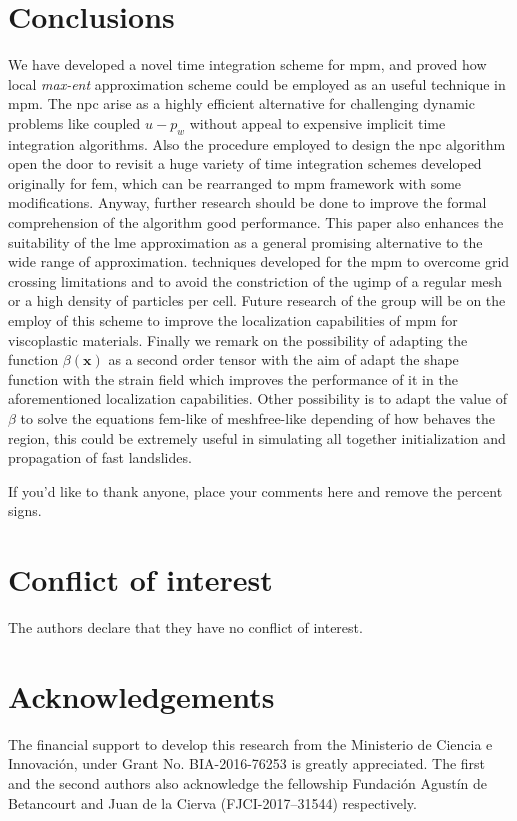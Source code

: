 \documentclass[preprint,12pt,a4paper]{elsarticle}
\newcommand{\vect}[1]{
  \ensuremath{\mathbf{{#1}}}
}
\begin{document}
\section{Conclusions}
\label{sec:conclusions}
We have developed a novel time integration scheme for \acrshort{mpm}, and
proved how local \textit{max-ent} approximation scheme could be
employed as an useful technique in \acrshort{mpm}. The \acrshort{npc} arise as a highly
efficient alternative for challenging dynamic problems like coupled
$u-p_w$ without appeal to expensive implicit time integration
algorithms. Also the procedure employed to design the \acrshort{npc} algorithm open
the door to revisit a huge variety of time integration schemes
developed originally for \acrshort{fem}, which can be rearranged to \acrshort{mpm} framework
with some modifications. Anyway, further research should be done to improve the
formal comprehension of the algorithm good performance. This paper
also enhances the suitability of the \acrshort{lme} approximation as a
general promising alternative to the wide range of approximation.
techniques developed for the \acrshort{mpm} to overcome grid crossing
limitations and to avoid the constriction of the \acrshort{ugimp} of a regular mesh
or a high density of particles per cell. Future research of the
group will be on the employ of this scheme to improve the localization
capabilities of \acrshort{mpm} for viscoplastic materials. Finally we remark on
the possibility of adapting the function $\beta(\vect{x})$ as a second
order tensor with the aim of adapt the shape function with the strain field which improves the
performance of it in the aforementioned localization
capabilities. Other possibility is to adapt the value of $\beta$ to
solve the equations \acrshort{fem}-like of meshfree-like depending of how behaves
the region, this could be extremely useful in simulating all together
initialization and propagation of fast landslides.

\begin{acknowledgements}
If you'd like to thank anyone, place your comments here
and remove the percent signs.
\end{acknowledgements}

% 
\section*{Conflict of interest}
%
The authors declare that they have no conflict of interest.

% 
\section*{Acknowledgements}
%
The financial support to develop this research from the Ministerio de Ciencia e Innovaci\'on, under Grant No. BIA-2016-76253 is greatly appreciated. The first and the second authors also acknowledge the fellowship Fundaci\'on Agust\'in de Betancourt and Juan de la Cierva (FJCI-2017–31544) respectively.
\end{document}
